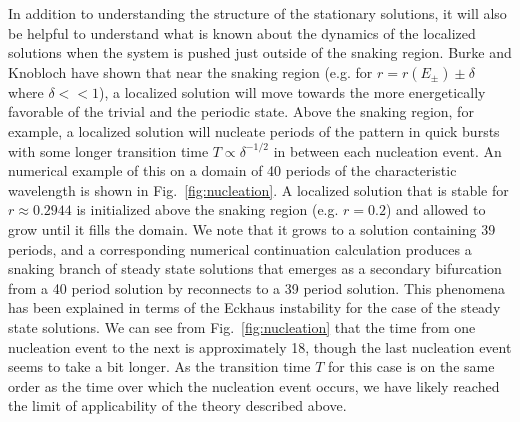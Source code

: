 \documentclass[pre,preprint,superscriptaddress]{revtex4-1}
\begin{document}
In addition to understanding the structure of the stationary solutions, it will also be helpful to understand what is known about the dynamics of the localized solutions when the system is pushed just outside of the snaking region.  Burke and Knobloch \cite{burke2006} have shown that near the snaking region (e.g. for $r=r(E_{\pm})\pm\delta$ where $\delta <<1$), a localized solution will move towards the more energetically favorable of the trivial and the periodic state.  Above the snaking region, for example, a localized solution will nucleate periods of the pattern in quick bursts with some longer transition time $T\propto \delta^{-1/2}$ in between each nucleation event.  An numerical example of this on a domain of 40 periods of the characteristic wavelength is shown in Fig.~\ref{fig:nucleation}.  A localized solution that is stable for $r\approx 0.2944$ is initialized above the snaking region (e.g. $r=0.2$) and allowed to grow until it fills the domain. We note that it grows to a solution containing 39 periods, and a corresponding numerical continuation calculation produces a snaking branch of steady state solutions that emerges as a secondary bifurcation from a 40 period solution by reconnects to a 39 period solution.  This phenomena has been explained \cite{bergeon2008} in terms of the Eckhaus instability for the case of the steady state solutions.  We can see from Fig.~\ref{fig:nucleation} that the time from one nucleation event to the next is approximately 18, though the last nucleation event seems to take a bit longer.  As the transition time $T$ for this case is on the same order as the time over which the nucleation event occurs, we have likely reached the limit of applicability of the theory described above.
\end{document}
